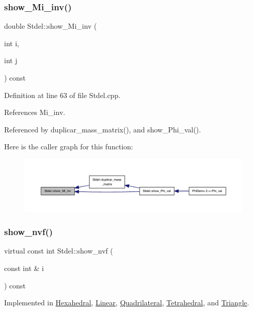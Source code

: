 \subsubsection{\texorpdfstring{show\+\_\+\+Mi\+\_\+inv()}{show\_Mi\_inv()}}
{\footnotesize\ttfamily double Stdel\+::show\+\_\+\+Mi\+\_\+inv (\begin{DoxyParamCaption}\item[{int}]{i,  }\item[{int}]{j }\end{DoxyParamCaption}) const}



Definition at line 63 of file Stdel.\+cpp.



References Mi\+\_\+inv.



Referenced by duplicar\+\_\+mass\+\_\+matrix(), and show\+\_\+\+Phi\+\_\+val().

Here is the caller graph for this function\+:
\nopagebreak
\begin{figure}[H]
\begin{center}
\leavevmode
\includegraphics[width=350pt]{classStdel_a11bf2897170ada9a9dd8f641a39585e5_icgraph}
\end{center}
\end{figure}
\mbox{\label{classStdel_a2a504322269a749dd3c443d0e86c4a6c}} 
\subsubsection{\texorpdfstring{show\+\_\+nvf()}{show\_nvf()}}
{\footnotesize\ttfamily virtual const int Stdel\+::show\+\_\+nvf (\begin{DoxyParamCaption}\item[{const int \&}]{i }\end{DoxyParamCaption}) const\hspace{0.3cm}{\ttfamily [pure virtual]}}



Implemented in \hyperlink{classHexahedral_a92b12c1e273117e9cc481e3a7204d90a}{Hexahedral}, \hyperlink{classLinear_a9f907dbeb4f31d1633f7f5819093881f}{Linear}, \hyperlink{classQuadrilateral_a1ee9b57112c7d840338d7326e4d86ffc}{Quadrilateral}, \hyperlink{classTetrahedral_a1359ac026b9e8d42109cc1fbdf4f6465}{Tetrahedral}, and \hyperlink{classTriangle_ad028de34010b57e995d0206f9257b37b}{Triangle}.



